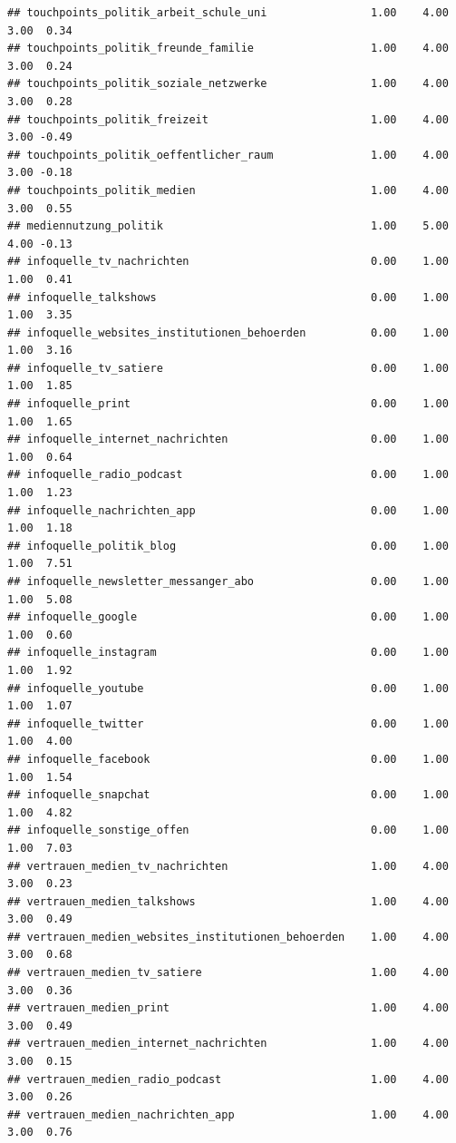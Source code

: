 \documentclass[
]{book}
\begin{document}
\begin{verbatim}
## touchpoints_politik_arbeit_schule_uni                1.00    4.00    3.00  0.34
## touchpoints_politik_freunde_familie                  1.00    4.00    3.00  0.24
## touchpoints_politik_soziale_netzwerke                1.00    4.00    3.00  0.28
## touchpoints_politik_freizeit                         1.00    4.00    3.00 -0.49
## touchpoints_politik_oeffentlicher_raum               1.00    4.00    3.00 -0.18
## touchpoints_politik_medien                           1.00    4.00    3.00  0.55
## mediennutzung_politik                                1.00    5.00    4.00 -0.13
## infoquelle_tv_nachrichten                            0.00    1.00    1.00  0.41
## infoquelle_talkshows                                 0.00    1.00    1.00  3.35
## infoquelle_websites_institutionen_behoerden          0.00    1.00    1.00  3.16
## infoquelle_tv_satiere                                0.00    1.00    1.00  1.85
## infoquelle_print                                     0.00    1.00    1.00  1.65
## infoquelle_internet_nachrichten                      0.00    1.00    1.00  0.64
## infoquelle_radio_podcast                             0.00    1.00    1.00  1.23
## infoquelle_nachrichten_app                           0.00    1.00    1.00  1.18
## infoquelle_politik_blog                              0.00    1.00    1.00  7.51
## infoquelle_newsletter_messanger_abo                  0.00    1.00    1.00  5.08
## infoquelle_google                                    0.00    1.00    1.00  0.60
## infoquelle_instagram                                 0.00    1.00    1.00  1.92
## infoquelle_youtube                                   0.00    1.00    1.00  1.07
## infoquelle_twitter                                   0.00    1.00    1.00  4.00
## infoquelle_facebook                                  0.00    1.00    1.00  1.54
## infoquelle_snapchat                                  0.00    1.00    1.00  4.82
## infoquelle_sonstige_offen                            0.00    1.00    1.00  7.03
## vertrauen_medien_tv_nachrichten                      1.00    4.00    3.00  0.23
## vertrauen_medien_talkshows                           1.00    4.00    3.00  0.49
## vertrauen_medien_websites_institutionen_behoerden    1.00    4.00    3.00  0.68
## vertrauen_medien_tv_satiere                          1.00    4.00    3.00  0.36
## vertrauen_medien_print                               1.00    4.00    3.00  0.49
## vertrauen_medien_internet_nachrichten                1.00    4.00    3.00  0.15
## vertrauen_medien_radio_podcast                       1.00    4.00    3.00  0.26
## vertrauen_medien_nachrichten_app                     1.00    4.00    3.00  0.76

\end{verbatim}
\end{document}
